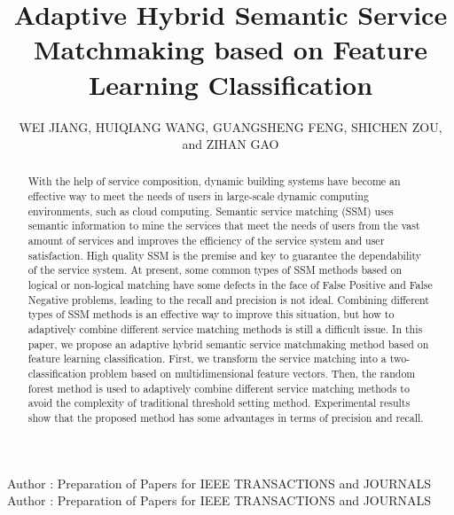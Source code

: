 \documentclass{ieeeaccess}
\begin{document}

\title{Adaptive Hybrid Semantic Service Matchmaking based on Feature Learning Classification}
\author{
\uppercase{Wei Jiang},
\uppercase{Huiqiang Wang},
\uppercase{Guangsheng Feng},
\uppercase{Shichen Zou},
and \uppercase{Zihan Gao}
}

\address[1]{College of Computer Science and Technology, Harbin Engineering University, Harbin, 150080, China}
\address[2]{College of Computer Science and Information Engineering, Harbin Normal University, Harbin, 150080, China}
\address[3]{Huawei Nanjing Research Institute, Huawei Technologies Co., Ltd., Nanjing, 210046, China}

\markboth
{Author \headeretal: Preparation of Papers for IEEE TRANSACTIONS and JOURNALS}
{Author \headeretal: Preparation of Papers for IEEE TRANSACTIONS and JOURNALS}


\begin{abstract}
With the help of service composition, dynamic building systems have become an effective way to meet the needs of users in large-scale dynamic computing environments, such as cloud computing. Semantic service matching (SSM) uses semantic information to mine the services that meet the needs of users from the vast amount of services and improves the efficiency of the service system and user satisfaction. High quality SSM is the premise and key to guarantee the dependability of the service system. At present, some common types of SSM methods based on logical or non-logical matching have some defects in the face of False Positive and False Negative problems, leading to the recall and precision is not ideal. Combining different types of SSM methods is an effective way to improve this situation, but how to adaptively combine different service matching methods is still a difficult issue. In this paper, we propose an adaptive hybrid semantic service matchmaking method based on feature learning classification. First, we transform the service matching into a two-classification problem based on multidimensional feature vectors. Then, the random forest method is used to adaptively combine different service matching methods to avoid the complexity of traditional threshold setting method. Experimental results show that the proposed method has some advantages in terms of precision and recall.
\end{abstract}
\end{document}
